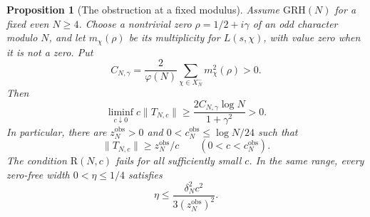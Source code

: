 \documentclass[12pt,a4paper]{amsart}
\numberwithin{equation}{section}
\def\le{\leqslant}
\def\ge{\geqslant}
\theoremstyle{plain}
\newtheorem{proposition}{Proposition}[section]
\theoremstyle{definition}
\theoremstyle{remark}
\begin{document}
\begin{proposition}[The obstruction at a fixed modulus]
\label{proof:v9:fixed-modulus-obstruction}
Assume $\mathrm{GRH}(N)$ for a fixed even $N\ge4$.
Choose a nontrivial zero $\rho=1/2+i\gamma$ of an odd character
modulo $N$, and let $m_\chi(\rho)$ be its multiplicity for
$L(s,\chi)$, with value zero when it is not a zero. Put
\[
 C_{N,\gamma}=\frac2{\varphi(N)}
     \sum_{\chi\in X_N^-}m_\chi^2(\rho)>0.
\]
Then
\[
 \liminf_{c\downarrow0}c\|T_{N,c}\|
 \ge\frac{2C_{N,\gamma}\log N}{1+\gamma^2}>0.
\]
In particular, there are $z_N^{\mathrm{obs}}>0$ and
$0<c_N^{\mathrm{obs}}\le\log N/24$ such that
\begin{equation}\label{proof:app:param:obstruction}
 \|T_{N,c}\|\ge z_N^{\mathrm{obs}}/c
 \qquad(0<c<c_N^{\mathrm{obs}}).
\end{equation}
The condition $\mathrm R(N,c)$ fails for all sufficiently small
$c$. In the same range, every zero-free width $0<\eta\le1/4$
satisfies
\[
 \eta\le\frac{\delta_N^2c^2}{3(z_N^{\mathrm{obs}})^2}.
\]
\end{proposition}
\end{document}
